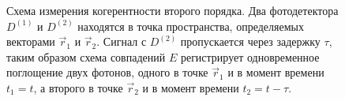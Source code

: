 \begin{figure}
\centering



\caption{Схема измерения когерентности второго порядка. Два
  фотодетектора $D^{(1)}$ и $D^{(2)}$ находятся в точка пространства,
  определяемых векторами $\vec{r}_1$ и $\vec{r}_2$. Сигнал с $D^{(2)}$
пропускается через задержку $\tau$, таким образом схема совпадений $E$
регистрирует одновременное поглощение двух фотонов, одного в точке
$\vec{r}_1$ и в момент времени $t_1 = t$, а второго в точке
$\vec{r}_2$ и в момент времени $t_2 = t - \tau$.}
\label{figPart4Ch2_add1}
\end{figure}
